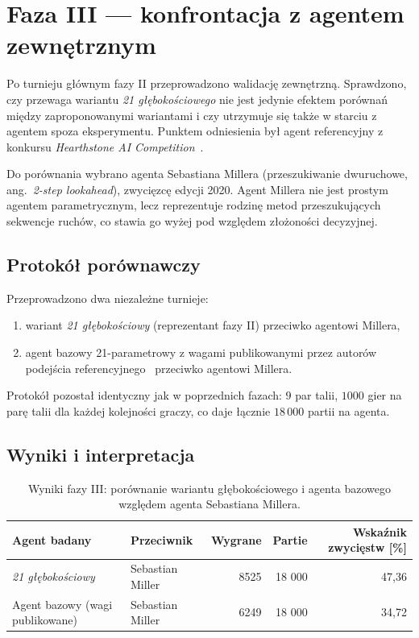 \section{Faza III — konfrontacja z agentem zewnętrznym}
\label{sec:phase3}

Po turnieju głównym fazy II przeprowadzono walidację zewnętrzną. Sprawdzono, czy przewaga wariantu \textit{21 głębokościowego} nie jest jedynie efektem porównań między zaproponowanymi wariantami i czy utrzymuje się także w starciu z agentem spoza eksperymentu. Punktem odniesienia był agent referencyjny z konkursu \textit{Hearthstone AI Competition}~\cite{hearthstone_competition,hearthstoneai_botdownloads_2020}.

Do porównania wybrano agenta Sebastiana Millera (przeszukiwanie dwuruchowe, ang.~\textit{2-step lookahead}), zwycięzcę edycji 2020. Agent Millera nie jest prostym agentem parametrycznym, lecz reprezentuje rodzinę metod przeszukujących sekwencje ruchów, co stawia go wyżej pod względem złożoności decyzyjnej.

\subsection{Protokół porównawczy}

Przeprowadzono dwa niezależne turnieje:
\begin{enumerate}
    \item wariant \textit{21 głębokościowy} (reprezentant fazy II) przeciwko agentowi Millera,
    \item agent bazowy 21-parametrowy z wagami publikowanymi przez autorów podejścia referencyjnego~\cite{sabberstone_coreai_results} przeciwko agentowi Millera.
\end{enumerate}

Protokół pozostał identyczny jak w poprzednich fazach: \(9\) par talii, \(1000\) gier na parę talii dla każdej kolejności graczy, co daje łącznie \(18\,000\) partii na agenta.

\subsection{Wyniki i interpretacja}

\begin{table}[ht]
\centering
\small
\begin{tabular}{llrrr}
\toprule
Agent badany & Przeciwnik & Wygrane & Partie & Wskaźnik zwycięstw [\%] \\
\midrule
\textit{21 głębokościowy} & Sebastian Miller & 8525 & 18 000 & 47,36 \\
Agent bazowy (wagi publikowane) & Sebastian Miller & 6249 & 18 000 & 34,72 \\
\bottomrule
\end{tabular}
\caption{Wyniki fazy III: porównanie wariantu głębokościowego i agenta bazowego względem agenta Sebastiana Millera.}
\label{tab:phase3-external-benchmark}
\end{table}

